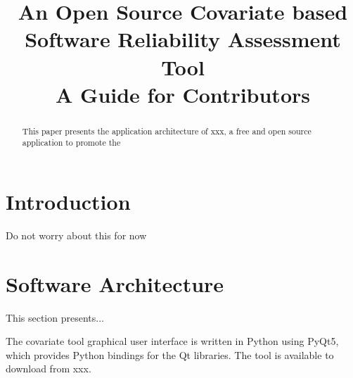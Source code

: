 \documentclass[conference]{IEEEtran}
\begin{document}
\title{An Open Source Covariate based Software Reliability Assessment Tool \\
	 A Guide for Contributors}

\author{
}

\maketitle

\begin{abstract}%
This paper presents the application architecture of xxx, a free and open source application to promote the
\end{abstract}



\section{Introduction}\label{sec:Intro}
Do not worry about this for now


\section{Software Architecture}\label{sec:Architecture}
This section presents...

The covariate tool graphical user interface is written in Python using PyQt5, which provides Python bindings for the Qt libraries. The tool is available to download from xxx.
\end{document}
